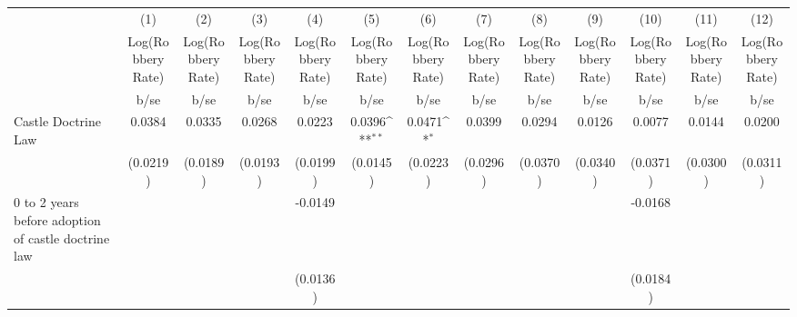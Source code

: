 {
\def\sym#1{\ifmmode^{#1}\else\(^{#1}\)\fi}
\begin{tabular}{l*{12}{c}}
\hline\hline
                    &\multicolumn{1}{c}{(1)}&\multicolumn{1}{c}{(2)}&\multicolumn{1}{c}{(3)}&\multicolumn{1}{c}{(4)}&\multicolumn{1}{c}{(5)}&\multicolumn{1}{c}{(6)}&\multicolumn{1}{c}{(7)}&\multicolumn{1}{c}{(8)}&\multicolumn{1}{c}{(9)}&\multicolumn{1}{c}{(10)}&\multicolumn{1}{c}{(11)}&\multicolumn{1}{c}{(12)}\\
                    &\multicolumn{1}{c}{Log(Robbery Rate)}&\multicolumn{1}{c}{Log(Robbery Rate)}&\multicolumn{1}{c}{Log(Robbery Rate)}&\multicolumn{1}{c}{Log(Robbery Rate)}&\multicolumn{1}{c}{Log(Robbery Rate)}&\multicolumn{1}{c}{Log(Robbery Rate)}&\multicolumn{1}{c}{Log(Robbery Rate)}&\multicolumn{1}{c}{Log(Robbery Rate)}&\multicolumn{1}{c}{Log(Robbery Rate)}&\multicolumn{1}{c}{Log(Robbery Rate)}&\multicolumn{1}{c}{Log(Robbery Rate)}&\multicolumn{1}{c}{Log(Robbery Rate)}\\
                    &        b/se         &        b/se         &        b/se         &        b/se         &        b/se         &        b/se         &        b/se         &        b/se         &        b/se         &        b/se         &        b/se         &        b/se         \\
\hline
Castle Doctrine Law &      0.0384         &      0.0335         &      0.0268         &      0.0223         &      0.0396\sym{**} &      0.0471\sym{*}  &      0.0399         &      0.0294         &      0.0126         &      0.0077         &      0.0144         &      0.0200         \\
                    &    (0.0219)         &    (0.0189)         &    (0.0193)         &    (0.0199)         &    (0.0145)         &    (0.0223)         &    (0.0296)         &    (0.0370)         &    (0.0340)         &    (0.0371)         &    (0.0300)         &    (0.0311)         \\
0 to 2 years before adoption of castle doctrine law&                     &                     &                     &     -0.0149         &                     &                     &                     &                     &                     &     -0.0168         &                     &                     \\
                    &                     &                     &                     &    (0.0136)         &                     &                     &                     &                     &                     &    (0.0184)         &                     &                     \\
\hline\hline
\end{tabular}
}
